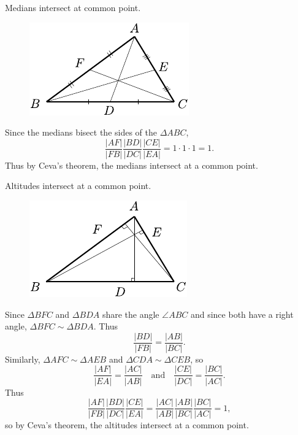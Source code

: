 \documentclass[twoside,10pt]{article}
\begin{document}
\newpage

\begin{exer}[1.167]
Medians intersect at common point.
\end{exer}

\begin{figure}[H]
	\centering
	\includegraphics[scale=1.5]{fig/167.pdf}
\end{figure}

Since the medians bisect the sides of the $\Delta ABC$,
\[
\frac{|AF|}{|FB|} \frac{|BD|}{|DC|} \frac{|CE|}{|EA|} = 1 \cdot 1 \cdot 1 = 1.
\] Thus by Ceva's theorem, the medians intersect at a common point.

\newpage

\begin{exer}[1.168]
Altitudes intersect at a common point.
\end{exer}

\begin{figure}[H]
	\centering
	\includegraphics[scale=1.5]{fig/168.pdf}
\end{figure}

Since $\Delta BFC$ and $\Delta BDA$ share the angle $\angle ABC$ and since both have a right angle, $\Delta BFC \sim \Delta BDA$. Thus
\[
\frac{|BD|}{|FB|} = \frac{|AB|}{|BC|} .
\] Similarly, $\Delta AFC \sim \Delta AEB$ and $\Delta CDA \sim \Delta CEB$, so
\[
	\frac{|AF|}{|EA|} = \frac{|AC|}{|AB|} \quad\text{and}\quad \frac{|CE|}{|DC|} = \frac{|BC|}{|AC|} .
\] Thus
\[
	\frac{|AF|}{|FB|} \frac{|BD|}{|DC|} \frac{|CE|}{|EA|} = \frac{|AC|}{|AB|} \frac{|AB|}{|BC|} \frac{|BC|}{|AC|} = 1,
\] so by Ceva's theorem, the altitudes intersect at a common point. 
\end{document}
